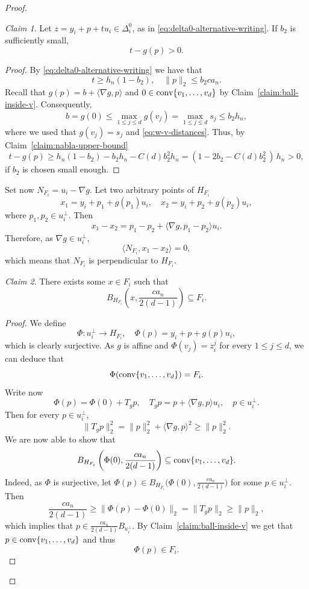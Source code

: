 \documentclass[10pt]{amsart}
\newcommand{\1}{\textbf{1}}
\newcommand{\conv}{{\rm conv}}
\numberwithin{equation}{section} %
\theoremstyle{remark}
\newtheorem{claim}{Claim}
\theoremstyle{definition}
\begin{document}
\begin{proof}
     \begin{claim}\label{claim:sign-of-difference}
     Let $z=y_i+p+tu_i \in \Delta_i^0$, as in \eqref{eq:delta0-alternative-writing}. If $b_2$ is sufficiently small, \[t-g(p)>0.\]       
     \end{claim}

     \begin{proof}
         By \eqref{eq:delta0-alternative-writing} we have that \[t \geq h_n(1-b_2), \quad \|p\|_2 \leq b_2ca_n.\] Recall that $g(p)=b+\langle \nabla g, p\rangle$ and $0 \in \conv\{v_1,\ldots,v_d\}$ by Claim~\ref{claim:ball-inside-v}. Consequently,  \[b=g(0) \leq \max_{1 \leq j \leq d} g(v_j) =\max_{1 \leq j \leq d} s_j \leq b_2h_n,\] where we used that $g(v_j)=s_j$ and \eqref{eq:w-v-distances}. Thus, by Claim~\ref{claim:nabla-upper-bound} \[t-g(p) \geq h_n(1-b_2)-b_2h_n-C(d)b_2^2h_n=(1-2b_2-C(d)b_2^2\,)\,h_n>0,\] if $b_2$ is chosen small enough.
     \end{proof}

     Set now $N_{F_i}=u_i-\nabla g.$ Let two arbitrary points of $H_{F_i}$ \[x_1=y_i+p_1+g(p_1)u_i, \quad x_2=y_i+p_2+g(p_2)u_i,\] where $p_1,p_2 \in u_i^\perp$. Then \[x_1-x_2=p_1-p_2+\langle \nabla g,p_1-p_2\rangle u_i.\] Therefore, as $\nabla g \in u_i^\perp$, \[\langle N_{F_i}, x_1-x_2\rangle=0,\] which means that $N_{F_i}$ is perpendicular to $H_{F_i}$. 

     \begin{claim}\label{claim:ball-in-F}
         There exists some $x \in F_i$ such that \[B_{H_{F_i}}\left(x,\frac{ca_n}{2(d-1)}\right) \subseteq F_i. \] 
     \end{claim}

     \begin{proof}
         We define \[\Phi: u_i^\perp \to H_{F_i}, \quad \Phi(p)=y_i+p+g(p)u_i,\] which is clearly surjective. As $g$ is affine and $\Phi(v_j)=z_i^j$ for every $1 \leq j \leq d$, we can deduce that  \[\Phi(\conv\{v_1,\ldots,v_d\})=F_i.\] Write now \[\Phi(p)=\Phi(0)+T_gp, \quad T_gp=p+\langle \nabla g,p\rangle u_i, \quad p\in u_i^\perp.\] Then for every $p \in u_i^\perp$, \[ \|T_gp\|_2^2=\|p\|_2^2+\langle \nabla g , p\rangle ^2 \geq \|p\|_2^2.\] We are now able to show that \[B_{H_{F_i}}\left(\Phi(0),\frac{ca_n}{2(d-1)}\right) \subseteq \conv\{v_1,\ldots,v_d\}.\] Indeed, as $\Phi$ is surjective, let $\Phi(p) \in B_{H_{F_i}}\bigl(\Phi(0),\frac{ca_n}{2(d-1)}\bigr)$ for some $p \in u_i^\perp$. Then \[\frac{ca_n}{2(d-1)} \geq\|\Phi(p)-\Phi(0)\|_2=\|T_gp\|_2 \geq \|p\|_2,\] which implies that $p \in \frac{ca_n}{2(d-1)} B_{u_i^\perp}$. By Claim~\ref{claim:ball-inside-v} we get that  $p \in \conv\{v_1,\ldots,v_d\}$ and thus \[\Phi(p) \in F_i.\]
     \end{proof}


\end{proof}
\end{document}
